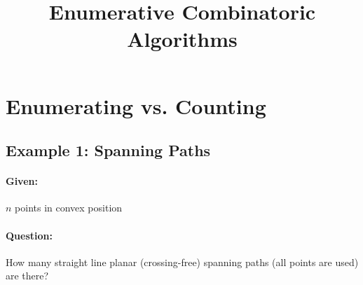 \documentclass[11pt]{article}
\begin{document}
\setlength{\parindent}{0pt}


\title{Enumerative Combinatoric Algorithms}
\author{}
\date {}

\maketitle

\tableofcontents

\newpage

\section{Enumerating vs. Counting}


\subsection{Example 1: Spanning Paths}

\paragraph{Given:} $ n $ points in convex position

\paragraph{Question:} How many straight line planar (crossing-free) spanning paths (all points are used) are there? \newline
\end{document}
